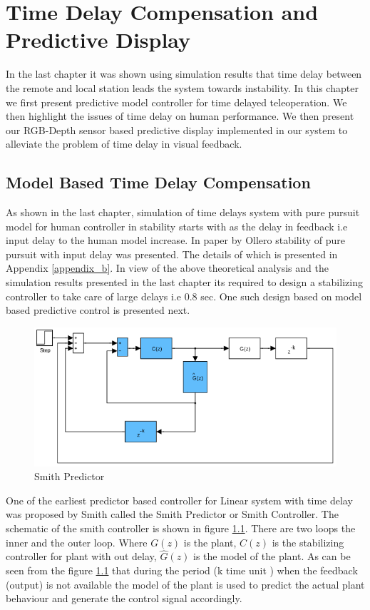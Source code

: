 \chapter{Time Delay Compensation and Predictive Display}
\label{ch_7:PDsply}
In the last chapter it was shown using simulation results that time delay between the remote and local station leads the system towards instability. In this chapter we first present predictive model controller for time delayed teleoperation. We then highlight the issues of time delay on human performance. We then present our  RGB-Depth sensor based  predictive display implemented in our system  to alleviate the problem of time delay in visual feedback.

\section {Model Based Time Delay Compensation}
As shown in the last chapter, simulation of time delays system with pure pursuit model for human controller in stability starts with as the delay in feedback i.e input delay to the human model increase. In paper by Ollero \cite{ollero1995stability} stability of pure pursuit with input delay was presented. The details of which is presented in Appendix \ref{appendix_b}.   In view of the above theoretical analysis and the simulation results presented in the last chapter its required to design  a stabilizing controller to take care of large delays i.e 0.8 sec. One such design based on model based predictive control is presented next.

 \begin{figure}
 	\includegraphics[width=\linewidth]{Chapter7/fig/Smith_predictor}
 	\caption{Smith Predictor}
 	\label{fig:Smith}
 \end{figure}
 
 One of the earliest predictor based controller for Linear system with time delay  was proposed by Smith \cite{smith1959controller} called the Smith Predictor or Smith Controller. The schematic of the smith controller is shown in figure \ref{fig:Smith}. There are two loops the inner and the outer loop. Where $G(z)$ is the plant, $C(z)$ is the stabilizing controller  for plant with out delay, $\hat{G}(z)$ is the model of the plant.  As can be seen from the figure \ref{fig:Smith} that during the period (k time unit ) when the feedback (output) is not available the model of the plant is used to predict the actual plant behaviour and generate the control signal accordingly. 
 
